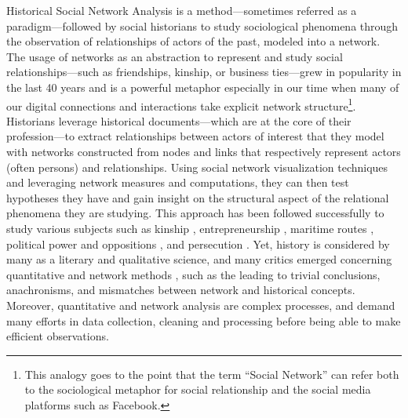 Historical Social Network Analysis is a method---sometimes referred as a paradigm---followed by social historians to study sociological phenomena through the observation of relationships of actors of the past, modeled into a network.
The usage of networks as an abstraction to represent and study social relationships---such as friendships, kinship, or business ties---grew in popularity in the last 40 years \cite{freemanDevelopmentSocialNetwork2004, tabassumSocialNetworkAnalysis2018} and is a powerful metaphor especially in our time when many of our digital connections and interactions take explicit network structure\footnote{This analogy goes to the point that the term ``Social Network'' can refer both to the sociological metaphor for social relationship and the social media platforms such as Facebook.}.
Historians leverage historical documents---which are at the core of their profession\cite{langloisIntroductionAuxEtudes2014}---to extract relationships between actors of interest that they model with networks constructed from nodes and links that respectively represent actors (often persons) and relationships.
Using social network visualization techniques and leveraging network measures and computations, they can then test hypotheses they have and gain insight on the structural aspect of the relational phenomena they are studying\cite{wetherellHistoricalSocialNetwork1998, kerschbaumerPowerNetworksProspects2015}.
This approach has been followed successfully to study various subjects such as kinship \cite{hambergerKinshipNetworkAnalysis2011}, entrepreneurship \cite{rubio-mondejarWomenEntrepreneursFamily2022}, maritime routes \cite{larsonThomasTartaronMaritime2014}, political power \cite{padgettRobustActionRise1993} and oppositions \cite{osaSolidarityContentionNetworks2003}, and persecution \cite{merckléPeutonModéliserPersécution2018}.
Yet, history is considered by many as a literary and qualitative science, and many critics emerged concerning quantitative and network methods \cite{lepetitHistoireQuantitativeDeux1989, guldiHistoryManifesto2014, karila-cohenNouvellesCuisinesHistoire2018, lemercier12FormalNetwork2015}, such as the leading to trivial conclusions, anachronisms, and mismatches between network and historical concepts.
Moreover, quantitative and network analysis are complex processes, and demand many efforts in data collection, cleaning and processing before being able to make efficient observations.

